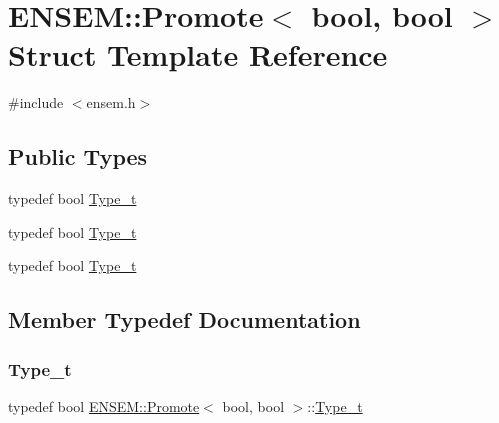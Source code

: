 \hypertarget{structENSEM_1_1Promote_3_01bool_00_01bool_01_4}{}\section{E\+N\+S\+EM\+:\+:Promote$<$ bool, bool $>$ Struct Template Reference}
\label{structENSEM_1_1Promote_3_01bool_00_01bool_01_4}


{\ttfamily \#include $<$ensem.\+h$>$}

\subsection*{Public Types}
\begin{DoxyCompactItemize}
\item 
typedef bool \mbox{\hyperlink{structENSEM_1_1Promote_3_01bool_00_01bool_01_4_a5838c93b09205ae2ab83138d0d4c02e4}{Type\+\_\+t}}
\item 
typedef bool \mbox{\hyperlink{structENSEM_1_1Promote_3_01bool_00_01bool_01_4_a5838c93b09205ae2ab83138d0d4c02e4}{Type\+\_\+t}}
\item 
typedef bool \mbox{\hyperlink{structENSEM_1_1Promote_3_01bool_00_01bool_01_4_a5838c93b09205ae2ab83138d0d4c02e4}{Type\+\_\+t}}
\end{DoxyCompactItemize}


\subsection{Member Typedef Documentation}
\mbox{\label{structENSEM_1_1Promote_3_01bool_00_01bool_01_4_a5838c93b09205ae2ab83138d0d4c02e4}} 
\subsubsection{\texorpdfstring{Type\_t}{Type\_t}\hspace{0.1cm}{\footnotesize\ttfamily [1/3]}}
{\footnotesize\ttfamily typedef bool \mbox{\hyperlink{structENSEM_1_1Promote}{E\+N\+S\+E\+M\+::\+Promote}}$<$ bool, bool $>$\+::\mbox{\hyperlink{structENSEM_1_1Promote_3_01bool_00_01bool_01_4_a5838c93b09205ae2ab83138d0d4c02e4}{Type\+\_\+t}}}

\mbox{\label{structENSEM_1_1Promote_3_01bool_00_01bool_01_4_a5838c93b09205ae2ab83138d0d4c02e4}} 
